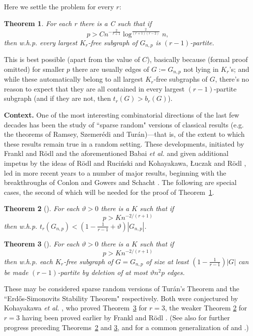 \documentclass[letterpaper,11pt]{article}
\newtheorem{thm}{Theorem}[section]
\newcommand{\beq}[1]{\begin{equation}\label{#1}}
\newcommand{\enq}[0]{\end{equation}}
\newcommand{\mn}[0]{\medskip\noindent}
\newcommand{\nin}[0]{\noindent}
\newcommand{\0}[0]{\emptyset}
\newcommand{\vt}[0]{\vartheta}
\begin{document}
Here we settle the problem for every $r$:
\begin{thm}\label{MT}
For each r there is a C such that if
\beq{p}
p > Cn^{-\tfrac{2}{r+1}}\log^{\tfrac{2}{(r+1)(r-2)}}n,
\enq
then w.h.p. every largest $K_r$-free subgraph of $G_{n,p}$ is $(r-1)$-partite.
\end{thm}
%


\mn
This
is best possible (apart from the value of $C$),
basically because (formal proof omitted)
for smaller $p$
there are usually edges of $G:=G_{n,p}$ not lying in $K_r$'s;
and while these
automatically belong to all largest $K_r$-free
subgraphs of $G$, there's no reason to expect that
they are all contained
in every largest $(r-1)$-partite subgraph
(and if they are not, then $t_r(G)>b_r(G)$).

\mn
{\bf Context.}
One of the most interesting combinatorial directions of the
last few decades has been the study of
``sparse random" versions of classical results
(e.g. the theorems of Ramsey, Szemer\'edi and
Tur\'an)---that is,
of the extent to which these results remain true in a
random setting.  These developments, initiated by
Frankl and R\"odl
\cite{FR86} and the aforementioned Babai {\em et al.} \cite{BSS}
and given additional impetus by the ideas of R\"odl and
Ruci\'nski \cite{RR1,RR2} and
Kohayakawa, \L uczak and R\"odl \cite{KLRAP,KLR},
led in more recent years to a number of major
results, beginning with the breakthroughs of
Conlon and Gowers \cite{Conlon-Gowers}
and Schacht \cite{Schacht}.
The following are special cases, the second of which
will be needed for the
proof of Theorem~\ref{MT}.
\begin{thm}[\cite{Conlon-Gowers,Schacht}]\label{Tdensity}
For each $\vartheta>0$ there is a $K$ such that
if
\[
p > Kn^{-2/(r+1)}
\]
then w.h.p. $t_r(G_{n,p}) < (1-\frac{1}{r-1}+\vt)|G_{n,p}|$.
\end{thm}
%
\begin{thm}[\cite{Conlon-Gowers}]\label{8.34}
For each $\vartheta>0$ there is a $K$ such that
if
\beq{p'}
p > Kn^{-2/(r+1)}
\enq
then w.h.p. each $K_r$-free
subgraph of $G=G_{n,p}$ of size at least $(1-\frac{1}{r-1})|G|$
can be made $(r-1)$-partite by deletion of at most
$\vartheta n^2p$ edges.
\end{thm}
%
\nin
These may be considered sparse random versions of
Tur\'an's Theorem and the ``Erd\H{o}s-Simonovits
Stability Theorem" \cite{Erdos,Simonovits} respectively.
Both were conjectured by Kohayakawa {\em et al.}
\cite{KLR}, who proved Theorem~\ref{8.34} for $r=3$,
the weaker Theorem  \ref{Tdensity} for $r=3$ having been proved earlier
by Frankl and R\"odl \cite{FR86}.
(See also \cite{GSS,Gerke} for further progress preceding
Theorems~\ref{Tdensity} and \ref{8.34},
and \cite{Samotij} for a common generalization of
\cite{Conlon-Gowers} and \cite{Schacht}.)
\end{document}
